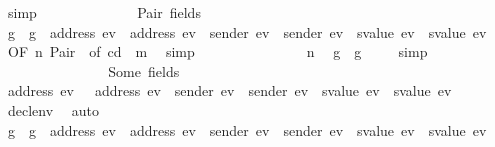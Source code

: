 \begin{isabellebody}
\ simp\isanewline
\ \ \ \ \ \ \ \ \ \ \ \ \isamarkupfalse%
\ Pair\ fields\ \isamarkupfalse%
\ {\isachardoublequoteopen}g{\isacharprime}{\kern0pt}\ {\isasymle}\ g{\isacharprime}{\kern0pt}{\isacharprime}{\kern0pt}\ {\isasymand}\ address\ ev\ {\isacharequal}{\kern0pt}\ address\ e\isactrlsub v{\isacharprime}{\kern0pt}{\isacharprime}{\kern0pt}\ {\isasymand}\ sender\ ev\ {\isacharequal}{\kern0pt}\ sender\ e\isactrlsub v{\isacharprime}{\kern0pt}{\isacharprime}{\kern0pt}\ {\isasymand}\ svalue\ ev\ {\isacharequal}{\kern0pt}\ svalue\ e\isactrlsub v{\isacharprime}{\kern0pt}{\isacharprime}{\kern0pt}{\isachardoublequoteclose}\ \isamarkupfalse%
\ {}{}{\isacharparenleft}{\kern0pt}{}{\isacharparenright}{\kern0pt}{\isacharbrackleft}{\kern0pt}OF\ n\ Pair\ {}{\isacharcomma}{\kern0pt}\ of\ cd{\isacharprime}{\kern0pt}{\isacharprime}{\kern0pt}\ {\isacharunderscore}{\kern0pt}\ m{\isacharprime}{\kern0pt}{\isacharprime}{\kern0pt}{\isacharbrackright}{\kern0pt}\ \isamarkupfalse%
\ simp\isanewline
\ \ \ \ \ \ \ \ \ \ \ \ \isamarkupfalse%
\ \isamarkupfalse%
\ n\ \isamarkupfalse%
\ {\isachardoublequoteopen}g{\isacharprime}{\kern0pt}{\isacharprime}{\kern0pt}\ {\isasymle}\ g{\isachardoublequoteclose}\ \isamarkupfalse%
\ {}{}{\isacharparenleft}{\kern0pt}{}{\isacharparenright}{\kern0pt}\ \isamarkupfalse%
\ simp\isanewline
\ \ \ \ \ \ \ \ \ \ \ \ \isamarkupfalse%
\ \isamarkupfalse%
\ Some\ fields\ \isamarkupfalse%
\ {\isachardoublequoteopen}address\ e\isactrlsub v{\isacharprime}{\kern0pt}{\isacharprime}{\kern0pt}\ {\isacharequal}{\kern0pt}\ \ address\ e\isactrlsub v{\isacharprime}{\kern0pt}\ {\isasymand}\ sender\ e\isactrlsub v{\isacharprime}{\kern0pt}{\isacharprime}{\kern0pt}\ {\isacharequal}{\kern0pt}\ sender\ e\isactrlsub v{\isacharprime}{\kern0pt}\ {\isasymand}\ svalue\ e\isactrlsub v{\isacharprime}{\kern0pt}{\isacharprime}{\kern0pt}\ {\isacharequal}{\kern0pt}\ svalue\ e\isactrlsub v{\isacharprime}{\kern0pt}{\isachardoublequoteclose}\ \isamarkupfalse%
\ decl{\isacharunderscore}{\kern0pt}env\ \isamarkupfalse%
\ auto\isanewline
\ \ \ \ \ \ \ \ \ \ \ \ \isamarkupfalse%
\ \isamarkupfalse%
\ {\isachardoublequoteopen}g{\isacharprime}{\kern0pt}\ {\isasymle}\ g\ {\isasymand}\ address\ ev\ {\isacharequal}{\kern0pt}\ address\ e\isactrlsub v{\isacharprime}{\kern0pt}\ {\isasymand}\ sender\ ev\ {\isacharequal}{\kern0pt}\ sender\ e\isactrlsub v{\isacharprime}{\kern0pt}\ {\isasymand}\ svalue\ ev\ {\isacharequal}{\kern0pt}\ svalue\ e\isactrlsub v{\isacharprime}{\kern0pt}{\isachardoublequoteclose}\ \isamarkupfalse%

\end{isabellebody}
